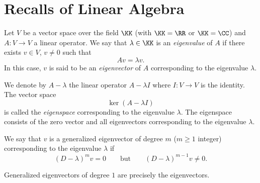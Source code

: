 \chapter{Recalls of Linear Algebra}

\begin{definition}
Let $V$ be a vector space over the field $\KK$ (with $\KK = \RR$ or $\KK=\CC$)
and $A\colon V\to V$ a linear operator.
We say that $\lambda\in \KK$ is an \emph{eigenvalue}%
 of $A$
if there exists $v\in V$, $v\neq 0$ such that
\[
  Av = \lambda v.
\]
In this case, $v$ is said to be an \emph{eigenvector}%
 of $A$ corresponding
to the eigenvalue $\lambda$.

We denote by $A-\lambda$ the linear operator $A-\lambda I$
where $I\colon V\to V$ is the identity.
The vector space
\[
  \ker (A-\lambda I)
\]
is called the \emph{eigenspace}%
 corresponding to the eigenvalue $\lambda$.
The eigenspace consists of the zero vector and all eigenvectors
corresponding to the eigenvalue $\lambda$.

We say that $v$ is a generalized eigenvector of degree $m$ ($m\ge 1$ integer)
corresponding to the eigenvalue $\lambda$
if
\[
 (D-\lambda)^m v = 0
 \qquad \text{but} \qquad
  (D-\lambda)^{m-1} v \neq 0.
\]

Generalized eigenvectors of degree $1$ are precisely the
eigenvectors.
\end{definition}

